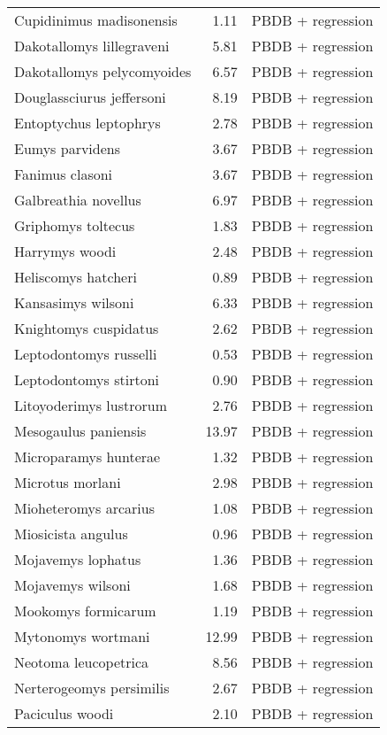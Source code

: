 \begin{table}[ht]
\begin{tabular}{lrl}
  Cupidinimus madisonensis & 1.11 & PBDB + regression \\ 
  Dakotallomys lillegraveni & 5.81 & PBDB + regression \\ 
  Dakotallomys pelycomyoides & 6.57 & PBDB + regression \\ 
  Douglassciurus jeffersoni & 8.19 & PBDB + regression \\ 
  Entoptychus leptophrys & 2.78 & PBDB + regression \\ 
  Eumys parvidens & 3.67 & PBDB + regression \\ 
  Fanimus clasoni & 3.67 & PBDB + regression \\ 
  Galbreathia novellus & 6.97 & PBDB + regression \\ 
  Griphomys toltecus & 1.83 & PBDB + regression \\ 
  Harrymys woodi & 2.48 & PBDB + regression \\ 
  Heliscomys hatcheri & 0.89 & PBDB + regression \\ 
  Kansasimys wilsoni & 6.33 & PBDB + regression \\ 
  Knightomys cuspidatus & 2.62 & PBDB + regression \\ 
  Leptodontomys russelli & 0.53 & PBDB + regression \\ 
  Leptodontomys stirtoni & 0.90 & PBDB + regression \\ 
  Litoyoderimys lustrorum & 2.76 & PBDB + regression \\ 
  Mesogaulus paniensis & 13.97 & PBDB + regression \\ 
  Microparamys hunterae & 1.32 & PBDB + regression \\ 
  Microtus morlani & 2.98 & PBDB + regression \\ 
  Mioheteromys arcarius & 1.08 & PBDB + regression \\ 
  Miosicista angulus & 0.96 & PBDB + regression \\ 
  Mojavemys lophatus & 1.36 & PBDB + regression \\ 
  Mojavemys wilsoni & 1.68 & PBDB + regression \\ 
  Mookomys formicarum & 1.19 & PBDB + regression \\ 
  Mytonomys wortmani & 12.99 & PBDB + regression \\ 
  Neotoma leucopetrica & 8.56 & PBDB + regression \\ 
  Nerterogeomys persimilis & 2.67 & PBDB + regression \\ 
  Paciculus woodi & 2.10 & PBDB + regression \\ 

\end{tabular}
\end{table}
